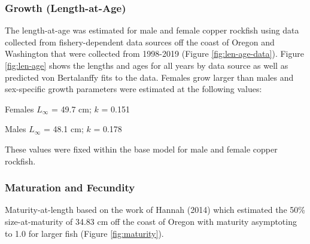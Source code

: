\documentclass[11pt,
  english,
  a4paper,
]{article}
\begin{document}
\leavevmode\tagmcend\tagstructend\par


\hypertarget{growth-length-at-age}{%
\subsubsection{Growth (Length-at-Age)}\label{growth-length-at-age}}

\leavevmode\tagmcend\tagstructend


The length-at-age was estimated for male and female copper rockfish using data collected from fishery-dependent data sources off the coast of Oregon and Washington that were collected from 1998-2019 (Figure \ref{fig:len-age-data}). Figure \ref{fig:len-age} shows the lengths and ages for all years by data source as well as predicted von Bertalanffy fits to the data. Females grow larger than males and sex-specific growth parameters were estimated at the following values:

\leavevmode\tagmcend\tagstructend\par

\begin{centering}

Females $L_{\infty}$ = 49.7 cm; $k$ = 0.151

Males $L_{\infty}$ = 48.1 cm; $k$ = 0.178

\end{centering}


These values were fixed within the base model for male and female copper rockfish.

\leavevmode\tagmcend\tagstructend\par


\hypertarget{maturation-and-fecundity}{%
\subsubsection{Maturation and Fecundity}\label{maturation-and-fecundity}}

\leavevmode\tagmcend\tagstructend


Maturity-at-length based on the work of Hannah {(2014)\leavevmode\tagmcend\tagstructend} which estimated the 50\% size-at-maturity of 34.83 cm off the coast of Oregon with maturity asymptoting to 1.0 for larger fish (Figure \ref{fig:maturity}).
\end{document}
